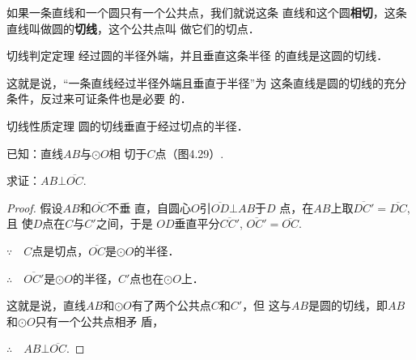 如果一条直线和一个圆只有一个公共点，我们就说这条
直线和这个圆\textbf{相切}，这条直线叫做圆的\textbf{切线}，这个公共点叫
做它们的切点．

\begin{blk}
    {切线判定定理} 经过圆的半径外端，并且垂直这条半径
的直线是这圆的切线．
\end{blk}

这就是说，“一条直线经过半径外端且垂直于半径”为
这条直线是圆的切线的充分条件，反过来可证条件也是必要
的．

\begin{blk}
    {切线性质定理} 圆的切线垂直于经过切点的半径．
\end{blk}

已知：直线$AB$与$\odot O$相
切于$C$点（图4.29）.

求证：$AB\bot \overline{OC}$.

\begin{proof}
    假设$AB$和$\overline{OC}$不垂
直，自圆心$O$引$\overline{OD}\bot AB$于$D$
点，在$AB$上取$\overline{DC'}=\overline{DC}$, 且
使$D$点在$C$与$C'$之间，于是
$OD$垂直平分$\overline{CC'}$, $\overline{OC'}=\overline{OC}$.

$\because\quad C$点是切点，$\overline{OC}$是$\odot O$的半径．

$\therefore\quad \overline{OC'}$是$\odot O$的半径，$C'$点也在$\odot O$上．

这就是说，直线$AB$和$\odot O$有了两个公共点$C$和$C'$，但
这与$AB$是圆的切线，即$AB$和$\odot O$只有一个公共点相矛
盾，

$\therefore\quad AB\bot \overline{OC}$.
\end{proof}

\begin{figure}[htp]\centering
    \begin{minipage}[t]{0.48\textwidth}
    \centering
    \caption{}
    \end{minipage}
    \begin{minipage}[t]{0.48\textwidth}
    \centering
    \caption{}
    \end{minipage}
    \end{figure}


